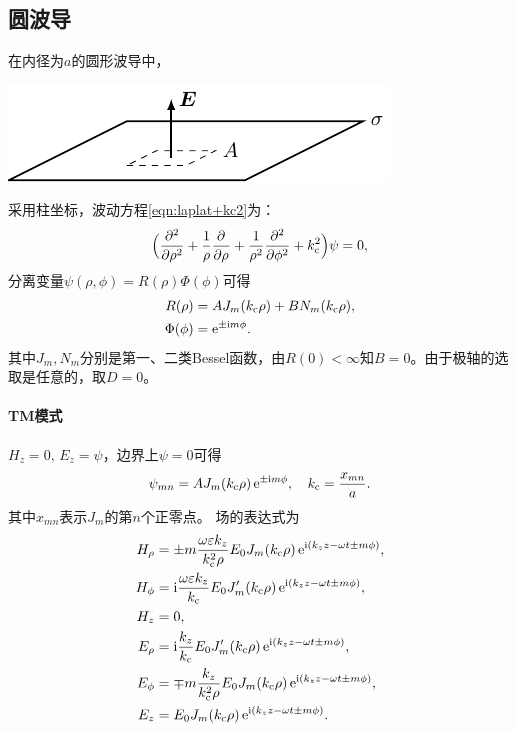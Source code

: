 \subsection{圆波导}

在内径为$a$的圆形波导中，
\begin{center}
    \includegraphics[page=28]{figures/tikz/layouts.pdf}
    \label{fig:circle waveguide}
\end{center}
采用柱坐标，波动方程\eqref{eqn:laplat+kc2}为：
\begin{equation}
    \Bigkh{\pp[2]\rho+\frac1\rho\pp\rho+\frac1{\rho^2}\pp[2]\phi+k\c^2}\psi=0,
\end{equation}
分离变量$\psi(\rho,\phi)=R(\rho)\Phi(\phi)$可得
\begin{align*}
    R(\rho)&=AJ_m(k\c\rho)+BN_m(k\c\rho),\\
    \Phi(\phi)&=\e{\pm\i m\phi}.
\end{align*}
其中$J_m,N_m$分别是第一、二类Bessel函数，由$R(0)<\infty$知$B=0$。由于极轴的选取是任意的，取$D=0$。

\paragraph{TM模式}

$H_z=0,\,E_z=\psi$，边界上$\psi=0$可得
\begin{equation}
    \psi_{mn}=AJ_m(k\c\rho)\e{\pm\i m\phi},\quad k\c=\frac{x_{mn}}a.
\end{equation}
其中$x_{mn}$表示$J_m$的第$n$个正零点。
场的表达式为
\begin{subequations}
    \begin{align*}
        H_\rho&=\pm m\frac{\omega\varepsilon k_z}{k\c^2\rho}E_0J_m(k\c\rho)\e{\i(k_zz-\omega t\pm m\phi)},\\
        H_\phi&=\i\frac{\omega\varepsilon k_z}{k\c}E_0J_m'(k\c\rho)\e{\i(k_zz-\omega t\pm m\phi)},\\
        H_z&=0,\\
        E_\rho&=\i\frac{k_z}{k\c}E_0J_m'(k\c\rho)\e{\i(k_zz-\omega t\pm m\phi)},\\
        E_\phi&=\mp m\frac{k_z}{k\c^2\rho}E_0J_m(k\c\rho)\e{\i(k_zz-\omega t\pm m\phi)},\\
        E_z&=E_0J_m(k\c\rho)\e{\i(k_zz-\omega t\pm m\phi)}.
    \end{align*}
\end{subequations}

